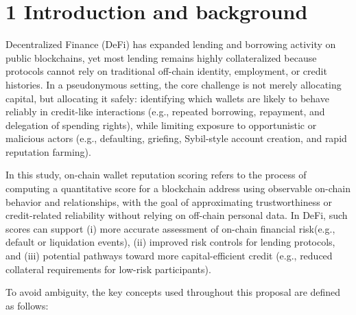 \documentclass[12pt]{article}
\begin{document}
\clearpage
{}
\section*{1 \textbf{Introduction and background}}
\label{sec:introduction-and-background}

Decentralized Finance (DeFi) has expanded lending and borrowing activity on public blockchains, yet most lending remains highly collateralized because protocols cannot rely on traditional off-chain identity, employment, or credit histories. In a pseudonymous setting, the core challenge is not merely allocating capital, but allocating it safely: identifying which wallets are likely to behave reliably in credit-like interactions (e.g., repeated borrowing, repayment, and delegation of spending rights), while limiting exposure to opportunistic or malicious actors (e.g., defaulting, griefing, Sybil-style account creation, and rapid reputation farming).


In this study, on-chain wallet reputation scoring refers to the process of computing a quantitative score for a blockchain address using observable on-chain behavior and relationships, with the goal of approximating trustworthiness or credit-related reliability without relying on off-chain personal data. In DeFi, such scores can support (i) more accurate assessment of on-chain financial risk(e.g., default or liquidation events), (ii) improved risk controls for lending protocols, and (iii) potential pathways toward more capital-efficient credit (e.g., reduced collateral requirements for low-risk participants).


To avoid ambiguity, the key concepts used throughout this proposal are defined as follows:
\end{document}
